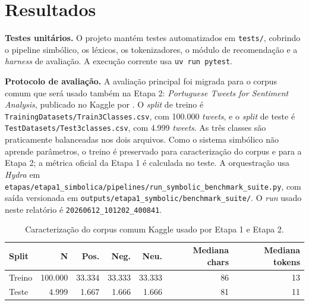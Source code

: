 \documentclass[11pt,a4paper]{article}
\newenvironment{addedblock}{\par\color{newblue}}{\par\color{black}}
\begin{document}
\begin{addedblock}
\section{Resultados}
\label{sec:resultados}

\textbf{Testes unitários.} O projeto mantém testes automatizados em \texttt{tests/}, cobrindo o pipeline simbólico, os léxicos, os tokenizadores, o módulo de recomendação e a \emph{harness} de avaliação. A execução corrente usa \texttt{uv run pytest}.

\textbf{Protocolo de avaliação.} A avaliação principal foi migrada para o corpus comum que será usado também na Etapa 2: \emph{Portuguese Tweets for Sentiment Analysis}, publicado no Kaggle por \citet{augustopKaggleTweets}. O \emph{split} de treino é \texttt{TrainingDatasets/Train3Classes.csv}, com 100.000 \emph{tweets}, e o \emph{split} de teste é \texttt{TestDatasets/Test3classes.csv}, com 4.999 \emph{tweets}. As três classes são praticamente balanceadas nos dois arquivos. Como o sistema simbólico não aprende parâmetros, o treino é preservado para caracterização do corpus e para a Etapa 2; a métrica oficial da Etapa 1 é calculada no teste. A orquestração usa \emph{Hydra} \citep{yadan2019hydra} em \texttt{etapas/etapa1\_simbolica/pipelines/run\_symbolic\_benchmark\_suite.py}, com saída versionada em \texttt{outputs/etapa1\_symbolic/benchmark\_suite/}. O \emph{run} usado neste relatório é \texttt{20260612\_101202\_400841}.

\begin{table}[h]
\small
\centering
\begin{tabular}{@{}lrrrrrr@{}}
\toprule
\textbf{Split} & \textbf{N} & \textbf{Pos.} & \textbf{Neg.} & \textbf{Neu.} & \textbf{Mediana chars} & \textbf{Mediana tokens} \\
\midrule
Treino & 100.000 & 33.334 & 33.333 & 33.333 & 86 & 13 \\
Teste  & 4.999   & 1.667  & 1.666  & 1.666  & 81 & 11 \\
\bottomrule
\end{tabular}
\caption{Caracterização do corpus comum Kaggle usado por Etapa 1 e Etapa 2.}
\label{tab:dataset-kaggle}
\end{table}

\begin{table}[h]
\small
\centering
{}
\caption{Resultado oficial da Etapa 1 no \emph{split} de teste Kaggle. Este valor passa a ser o ponto de comparação interno para os modelos da Etapa 2.}
\label{tab:benchmark}
\end{table}


\end{addedblock}
\end{document}
